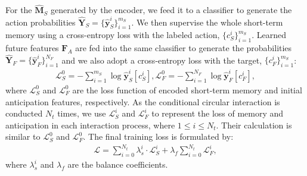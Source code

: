 For the  $\mathbf{\widehat{M}}_S$ generated by the encoder, we feed it to a classifier to generate the action probabilities $ \mathbf{\widehat{Y}}_S = \{ \mathbf{\widehat{y}}_S^{i} \}_{i=1}^{m_S} $. 
We then supervise the whole short-term memory using a cross-entropy loss with the labeled action, $ \{ c_S^{i} \}_{i=1}^{m_S} $. 
Learned future features $ \mathbf{F}_A $ are fed into the same classifier to generate the probabilities $ \mathbf{\widehat{Y}}_F = \{ \mathbf{\widehat{y}}_F^{i} \}_{i=1}^{N_F} $ and we also adopt a cross-entropy loss with the target, $ \{ c_F^{i} \}_{i=1}^{m_S} $:
\begin{equation}
    \begin{aligned}
        \mathcal{L}_S^{0}  = -\sum_{i=1}^{m_S}\log\mathbf{\widehat{y}}_S^{i}[c_S^i],
        \mathcal{L}_F^{0}  = -\sum_{i=1}^{N_F}\log\mathbf{\widehat{y}}_F^{i}[c_F^{i}],
    \end{aligned}
\end{equation}
where $\mathcal{L}_S^{0}$ and $\mathcal{L}_F^{0}$ are the loss function of encoded short-term memory and initial anticipation features, respectively.
As the conditional circular interaction is conducted $ N_t $ times, we use $\mathcal{L}_S^{i}$ and $\mathcal{L}_F^{i}$ to represent the loss of memory and anticipation in each interaction process, where $1 \leq i \leq N_t$. Their calculation is similar to $\mathcal{L}_S^{0}$ and $\mathcal{L}_F^{0}$.
The final training loss is formulated by:
\begin{equation}
    \begin{aligned}
        \mathbf{\mathcal{L}}=\sum_{i=0}^{N_t}\lambda_{s}^{i}\cdot\mathcal{L}_S^{i}+\lambda_f\sum_{i=0}^{N_t}\mathcal{L}_F^{i},
    \end{aligned}
\end{equation}
where $ \lambda_s^i $ and $ \lambda_f $ are the balance coefficients.





